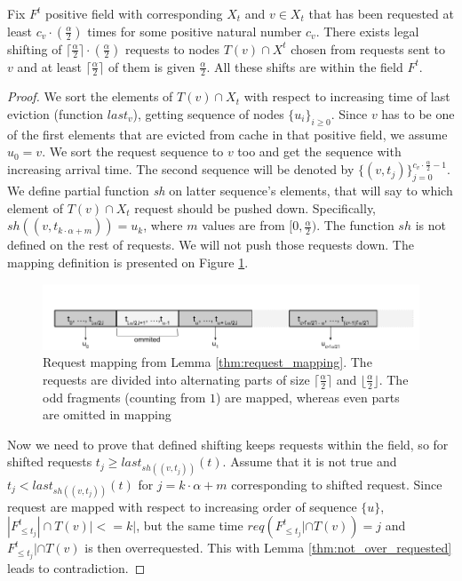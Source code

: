 \begin{lemma}
Fix $F^t$ positive field with corresponding $X_t$ and $v \in X_t$ that has 
been requested at least $c_v \cdot (\frac{\alpha}{2})$ times for some positive 
natural number $c_v$. There exists legal shifting of $\lceil \frac{\alpha}{2} 
\rceil \cdot (\frac{\alpha}{2})$ requests to nodes 
$T(v) \cap X^t$ chosen from requests sent to $v$ and at least $\lceil 
\frac{\alpha}{2} \rceil$ of them is given 
$\frac{\alpha}{2}$. All these shifts are within the field $F^t$.
\label{thm:request_mapping}
\end{lemma}
\begin{proof}
We sort the elements of $T(v) \cap X_t$ with respect to increasing time of last 
eviction (function $last_v$), getting sequence of nodes $\{u_i\}_{i \geq 
0}$. Since $v$ has to be one of the first elements that are evicted from cache 
in that positive field, we assume $u_0 = v$. We sort the request sequence to 
$v$ too and get the sequence with increasing arrival time. The second 
sequence will be denoted by $\{(v, t_j)\}_{j=0}^{c_v \cdot \frac{\alpha}{2} - 
1}$. We define partial function \textit{sh} on latter sequence's 
elements, that will say to which element of $T(v) \cap X_t$ request should be 
pushed down. Specifically, $sh((v, t_{k \cdot \alpha + m})) = u_k$, where $m$ 
values are from $[0, \frac{\alpha}{2})$. The function $sh$ is not defined on 
the rest of requests. We will not push those requests down. The 
mapping definition is presented on Figure \ref{fig:req_map}.
\begin{figure}
 \begin{center}
  \includegraphics[width=1.1\textwidth]{request_mapping.png}
 \end{center}
 \caption{Request mapping from Lemma \ref{thm:request_mapping}. The requests 
are divided into alternating parts of size $\lceil \frac{\alpha}{2} \rceil$ 
and $\lfloor \frac{\alpha}{2} \rfloor$. The odd fragments (counting from $1$) 
are mapped, whereas even parts are omitted in mapping}
 \label{fig:req_map}
\end{figure}

Now we need to prove that defined shifting keeps requests within the field, 
so 
for shifted requests $t_j \geq last_{sh((v, t_j))}(t)$. Assume that it is not 
true and $t_j < last_{sh((v, t_j))}(t)$ for $j = k \cdot \alpha + m$ 
corresponding to shifted request. Since request are mapped with respect to 
increasing order of sequence $\{u\}$, $|F^t_{\leq t_j}| \cap T(v)| <= k|$, but 
the same time $req(F^t_{\leq t_j}| \cap T(v)) = j$ and $F^t_{\leq t_j}| \cap 
T(v)$ is then overrequested. This with Lemma \ref{thm:not_over_requested} leads 
to contradiction.
\end{proof}
